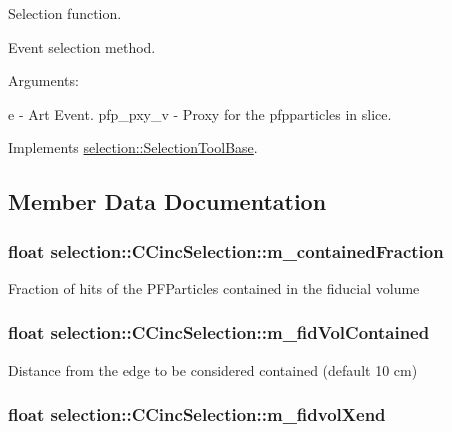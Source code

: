 Selection function. 

Event selection method.

Arguments\-:

e -\/ Art Event. pfp\-\_\-pxy\-\_\-v -\/ Proxy for the pfpparticles in slice. 

Implements \hyperlink{classselection_1_1SelectionToolBase_ab63818dac49b43418fe9eb3b8cd98c9c}{selection\-::\-Selection\-Tool\-Base}.



\subsection{Member Data Documentation}
\hypertarget{classselection_1_1CCincSelection_a5ac3c52c6a88691182c3b3c6594d9744}{
\subsubsection[{m\-\_\-contained\-Fraction}]{\setlength{\rightskip}{0pt plus 5cm}float selection\-::\-C\-Cinc\-Selection\-::m\-\_\-contained\-Fraction\hspace{0.3cm}{\ttfamily [private]}}}\label{classselection_1_1CCincSelection_a5ac3c52c6a88691182c3b3c6594d9744}
Fraction of hits of the P\-F\-Particles contained in the fiducial volume \hypertarget{classselection_1_1CCincSelection_a3412d86b03a97a65fed3d5d8a41ed2c0}{
\subsubsection[{m\-\_\-fid\-Vol\-Contained}]{\setlength{\rightskip}{0pt plus 5cm}float selection\-::\-C\-Cinc\-Selection\-::m\-\_\-fid\-Vol\-Contained\hspace{0.3cm}{\ttfamily [private]}}}\label{classselection_1_1CCincSelection_a3412d86b03a97a65fed3d5d8a41ed2c0}
Distance from the edge to be considered contained (default 10 cm) \hypertarget{classselection_1_1CCincSelection_ae4bab4cf8ea55e54fcdaa66d2fe44c1d}{
\subsubsection[{m\-\_\-fidvol\-Xend}]{\setlength{\rightskip}{0pt plus 5cm}float selection\-::\-C\-Cinc\-Selection\-::m\-\_\-fidvol\-Xend\hspace{0.3cm}{\ttfamily [private]}}}\label{classselection_1_1CCincSelection_ae4bab4cf8ea55e54fcdaa66d2fe44c1d}
